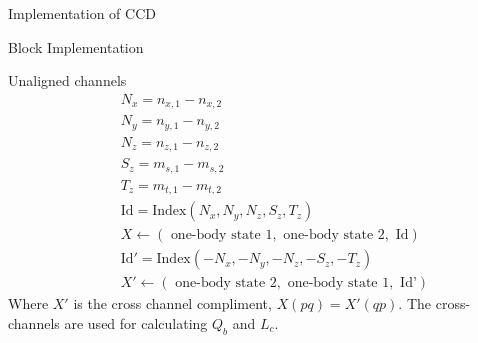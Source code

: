 \documentclass[twoside,english]{uiofysmaster}
\begin{document}
\begin{chapter}{Implementation of CCD}
\begin{section}{Block Implementation}
\begin{subsection}{Unaligned channels}
\begin{align*}
				&\:\:\:\:\:\: N_x = n_{x,1} - n_{x,2} \\
				&\:\:\:\:\:\: N_y = n_{y,1} - n_{y,2} \\
				&\:\:\:\:\:\: N_z = n_{z,1} - n_{z,2} \\
 				&\:\:\:\:\:\: S_z = m_{s,1} - m_{s,2} \\
				&\:\:\:\:\:\: T_z = m_{t,1} - m_{t,2} \\
				&\:\:\:\:\:\: \text{Id} = \text{Index}(N_x,N_y,N_z,S_z,T_z) \\
				&\:\:\:\:\:\: X \leftarrow (\text{ one-body state 1}, \text{ one-body state 2}, \text{ Id}) \\
				&\:\:\:\:\:\: \text{Id}' = \text{Index}(-N_x,-N_y,-N_z,-S_z,-T_z) \\
				&\:\:\:\:\:\: X' \leftarrow (\text{ one-body state 2}, \text{ one-body state 1}, \text{ Id'})
			\end{align*}
			Where $X'$ is the cross channel compliment, $X(pq) = X'(qp)$. The cross-channels are used for calculating $Q_b$ and $L_c$. 


\end{subsection}
\end{section}
\end{chapter}
\end{document}
